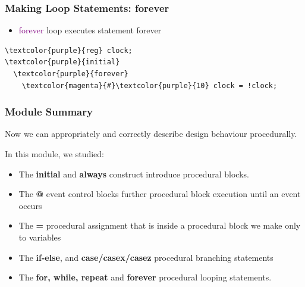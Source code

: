 \documentclass[t, notes, xcolor=table]{beamer}
\begin{document}
\begin{frame}[fragile]
\frametitle{Making Loop Statements: forever}
\begin{itemize}
\item \textcolor{purple}{forever} loop executes statement forever
\end{itemize}


\begin{Verbatim}[commandchars=\\\{\}, tabsize=2]
\textcolor{purple}{reg} clock;
\textcolor{purple}{initial}
  \textcolor{purple}{forever}
    \textcolor{magenta}{#}\textcolor{purple}{10} clock = !clock;
\end{Verbatim}
\end{frame}

\begin{frame}
\frametitle{Module Summary}
\scriptsize{
Now we can appropriately and correctly describe design behaviour procedurally.
\newline

In this module, we studied:
\begin{itemize}
\item The \textbf{initial} and \textbf{always} construct introduce procedural blocks.
\item The \textbf{@} event control blocks further procedural block execution until an event occurs
\item The \textbf{=} procedural assignment that is inside a procedural block we make only to variables
\item The \textbf{if-else}, and \textbf{case/casex/casez} procedural branching statements
\item The \textbf{for, while, repeat} and \textbf{forever} procedural looping statements.
\end{itemize}
}
\end{frame}
\end{document}
